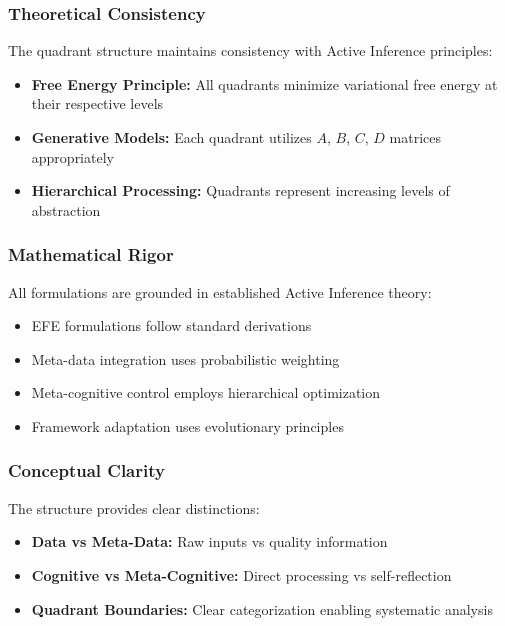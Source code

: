 \documentclass[
]{article}
\providecommand{\tightlist}{%
  \setlength{\itemsep}{0pt}\setlength{\parskip}{0pt}}
\begin{document}
\subsubsection{Theoretical Consistency}\label{theoretical-consistency}

The quadrant structure maintains consistency with Active Inference
principles:

\begin{itemize}
\tightlist
\item
  \textbf{Free Energy Principle:} All quadrants minimize variational
  free energy at their respective levels
\item
  \textbf{Generative Models:} Each quadrant utilizes \(A\), \(B\),
  \(C\), \(D\) matrices appropriately
\item
  \textbf{Hierarchical Processing:} Quadrants represent increasing
  levels of abstraction
\end{itemize}

\subsubsection{Mathematical Rigor}\label{mathematical-rigor}

All formulations are grounded in established Active Inference theory:

\begin{itemize}
\tightlist
\item
  EFE formulations follow standard derivations
\item
  Meta-data integration uses probabilistic weighting
\item
  Meta-cognitive control employs hierarchical optimization
\item
  Framework adaptation uses evolutionary principles
\end{itemize}

\subsubsection{Conceptual Clarity}\label{conceptual-clarity}

The structure provides clear distinctions:

\begin{itemize}
\tightlist
\item
  \textbf{Data vs Meta-Data:} Raw inputs vs quality information
\item
  \textbf{Cognitive vs Meta-Cognitive:} Direct processing vs
  self-reflection
\item
  \textbf{Quadrant Boundaries:} Clear categorization enabling systematic
  analysis
\end{itemize}
\end{document}
